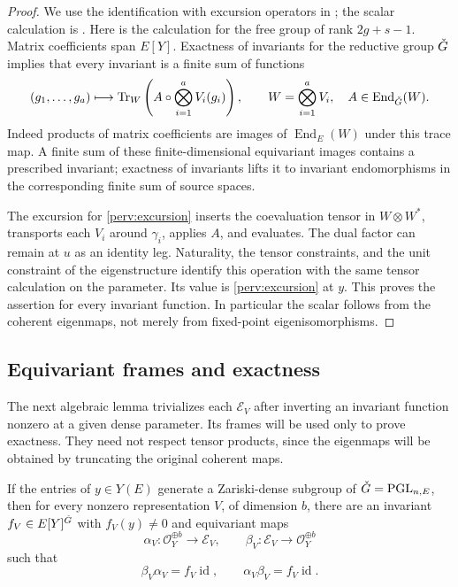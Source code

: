 \begin{proof}
We use the identification with excursion operators in
\cite[\S7.1 and Proposition~7.2.3]{NY}; the scalar calculation is
\cite[Lemma~6.2]{CT}.  Here is the calculation for the free group of
rank $2g+s-1$.  Matrix coefficients span $E[Y]$.  Exactness of
invariants for the reductive group $\check G$ implies that every invariant
is a finite sum of functions
\begin{equation}\label{perv:excursion}
 (g_1,\ldots,g_a)\longmapsto
 \operatorname{Tr}_{W}\left(A\circ\bigotimes_{i=1}^{a}V_i(g_i)\right),
 \qquad W=\bigotimes_{i=1}^{a}V_i,\quad
 A\in\operatorname{End}_{\check G}(W).
\end{equation}
Indeed products of matrix coefficients are images of
$\operatorname{End}_E(W)$ under this trace map.  A finite sum of these
finite-dimensional equivariant images contains a prescribed invariant;
exactness of invariants lifts it to invariant endomorphisms in the
corresponding finite sum of source spaces.

The excursion for \eqref{perv:excursion} inserts the coevaluation tensor
in $W\otimes W^*$, transports each $V_i$ around $\gamma_i$, applies
$A$, and evaluates.  The dual factor can remain at $u$ as an identity
leg.  Naturality, the tensor constraints, and the unit constraint of the
eigenstructure identify this operation with the same tensor calculation
on the parameter.  Its value is \eqref{perv:excursion} at $y$.
This proves the assertion for every invariant function.  In particular
the scalar follows from the coherent eigenmaps, not merely from
fixed-point eigenisomorphisms.
\end{proof}

\subsection{Equivariant frames and exactness}

The next algebraic lemma trivializes each $\mathscr E_V$ after inverting
an invariant function nonzero at a given dense parameter.
Its frames will be used only to prove
exactness.  They need not respect tensor products, since the eigenmaps
will be obtained by truncating the original coherent maps.

\begin{lemma}\label{perv:frame}
If the entries of $y\in Y(E)$ generate a Zariski-dense subgroup of
$\check G=\mathrm{PGL}_{n,E}$, then for every nonzero representation $V$,
of dimension $b$, there are an invariant $f_V\in E[Y]^{\check G}$ with
$f_V(y)\ne0$ and equivariant maps
\[
 \alpha_V:\mathcal O_Y^{\oplus b}\longrightarrow\mathscr E_V,
 \qquad
 \beta_V:\mathscr E_V\longrightarrow\mathcal O_Y^{\oplus b}
\]
such that
\begin{equation}\label{perv:adjugates}
 \beta_V\alpha_V=f_V\operatorname{id},\qquad
 \alpha_V\beta_V=f_V\operatorname{id}.
\end{equation}
\end{lemma}


